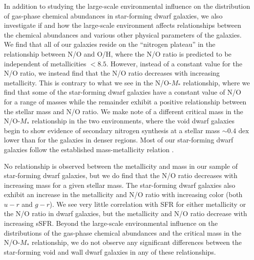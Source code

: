 In addition to studying the large-scale environmental influence on the 
distribution of gas-phase chemical abundances in star-forming dwarf galaxies, we 
also investigate if and how the large-scale environment affects relationships 
between the chemical abundances and various other physical parameters of the 
galaxies.  We find that all of our galaxies reside on the ``nitrogen plateau'' 
in the relationship between N/O and O/H, where the N/O ratio is predicted to be 
independent of metallicities \OH $< 8.5$.  However, instead of a constant value 
for the N/O ratio, we instead find that the N/O ratio decreases with increasing 
metallicity.  This is contrary to what we see in the N/O-$M_*$ relationship, 
where we find that some of the star-forming dwarf galaxies have a constant value 
of N/O for a range of masses while the remainder exhibit a positive relationship 
between the stellar mass and N/O ratio.  We make note of a different critical 
mass in the N/O-$M_*$ relationship in the two environments, where the void dwarf 
galaxies begin to show evidence of secondary nitrogen synthesis at a stellar 
mass $\sim 0.4\text{ dex}$ lower than for the galaxies in denser regions.  Most 
of our star-forming dwarf galaxies follow the established mass-metallicity 
relation \citep[e.g.,][]{Tremonti04}.

No relationship is observed between the metallicity and  mass in our 
sample of star-forming dwarf galaxies, but we do find that the N/O ratio 
decreases with increasing  mass for a given stellar mass.  The 
star-forming dwarf galaxies also exhibit an increase in the metallicity and 
N/O ratio with increasing color (both $u-r$ and $g-r$).  We see very little 
correlation with SFR for either metallicity or the N/O ratio in dwarf galaxies, 
but the metallicity and N/O ratio decrease with increasing sSFR.  Beyond the 
large-scale environmental influence on the distributions of the gas-phase 
chemical abundances and the critical mass in the N/O-$M_*$ relationship, we do 
not observe any significant differences between the star-forming void and wall 
dwarf galaxies in any of these relationships.

